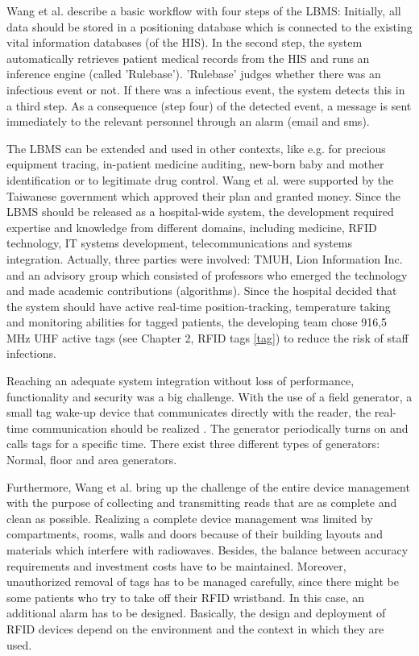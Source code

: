 Wang et al. describe a basic workflow with four steps of the LBMS: Initially, all data should be stored in a positioning database which is connected to the existing vital information databases (of the HIS). In the second step, the system automatically retrieves patient medical records from the HIS and runs an inference engine (called 'Rulebase').  'Rulebase' judges whether there was an infectious event or not. If there was a infectious event, the system detects this in a third step. As a consequence (step four) of the detected event, a message is sent immediately to the relevant personnel through an alarm (email and sms). 

The LBMS can be extended and used in other contexts, like e.g. for precious equipment tracing, in-patient medicine auditing, new-born baby and mother identification or to legitimate drug control.
Wang et al. were supported by the Taiwanese government which approved their plan and granted money. Since the LBMS should be released as a hospital-wide system, the development required expertise and knowledge from different domains, including medicine, RFID technology, IT systems development, telecommunications and systems integration. Actually, three parties were involved: TMUH, Lion Information Inc. and an advisory group \cite[p.4]{casestudy} which consisted of professors who emerged the technology and made academic contributions (algorithms).
Since the hospital decided that the system should have active real-time position-tracking, temperature taking and monitoring abilities for tagged patients, the developing team chose 916,5 MHz UHF active tags (see Chapter 2, RFID tags \ref{tag}) to reduce the risk of staff infections.

Reaching an adequate system integration without loss of performance, functionality and security was a big challenge. With the use of a field generator, a small tag wake-up device that communicates directly with the reader, the real-time communication should be realized \cite[p.4]{casestudy}. The generator periodically turns on and calls tags for a specific time. There exist three different types of generators: Normal, floor and area generators.

Furthermore, Wang et al. bring up the challenge of the entire device management \cite[p.5]{casestudy} with the purpose of collecting and transmitting reads that are as complete and clean as possible. Realizing a complete device management was limited by compartments, rooms, walls and doors because of their building layouts and materials which interfere with radiowaves. Besides, the balance between accuracy requirements and investment costs have to be maintained. Moreover, unauthorized removal of tags has to be managed carefully, since there might be some patients who try to take off their RFID wristband. In this case, an additional alarm has to be designed. Basically, the design and deployment of RFID devices depend on the environment and the context in which they are used. 

